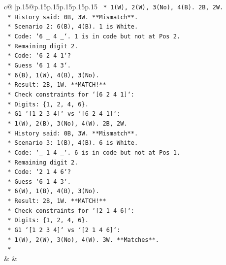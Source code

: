 \documentclass{article}
\begin{document}
{\begin{supertabular}{c@{$\;$}|p{.15\linewidth}@{}p{.15\linewidth}p{.15\linewidth}p{.15\linewidth}p{.15\linewidth}p{.15\linewidth}}
{{{\texttt{                    *   1(W), 2(W), 3(No), 4(B). 2B, 2W.} \\
\texttt{                    *   History said: 0B, 3W. **Mismatch**.} \\
\texttt{        *   Scenario 2: 6(B), 4(B). 1 is White.} \\
\texttt{            *   Code: `6 \_ 4 \_`. 1 is in code but not at Pos 2.} \\
\texttt{            *   Remaining digit 2.} \\
\texttt{            *   Code: `6 2 4 1`?} \\
\texttt{                *   Guess `6 1 4 3`.} \\
\texttt{                *   6(B), 1(W), 4(B), 3(No).} \\
\texttt{                *   Result: 2B, 1W. **MATCH!**} \\
\texttt{            *   Check constraints for `{[}6 2 4 1{]}`:} \\
\texttt{                *   Digits: \{1, 2, 4, 6\}.} \\
\texttt{                *   G1 `{[}1 2 3 4{]}` vs `{[}6 2 4 1{]}`:} \\
\texttt{                    *   1(W), 2(B), 3(No), 4(W). 2B, 2W.} \\
\texttt{                    *   History said: 0B, 3W. **Mismatch**.} \\
\texttt{        *   Scenario 3: 1(B), 4(B). 6 is White.} \\
\texttt{            *   Code: `\_ 1 4 \_`. 6 is in code but not at Pos 1.} \\
\texttt{            *   Remaining digit 2.} \\
\texttt{            *   Code: `2 1 4 6`?} \\
\texttt{                *   Guess `6 1 4 3`.} \\
\texttt{                *   6(W), 1(B), 4(B), 3(No).} \\
\texttt{                *   Result: 2B, 1W. **MATCH!**} \\
\texttt{            *   Check constraints for `{[}2 1 4 6{]}`:} \\
\texttt{                *   Digits: \{1, 2, 4, 6\}.} \\
\texttt{                *   G1 `{[}1 2 3 4{]}` vs `{[}2 1 4 6{]}`:} \\
\texttt{                    *   1(W), 2(W), 3(No), 4(W). 3W. **Matches**.} \\
\texttt{                *} \\
            }
        }
    }
    & & \\ \\


\end{supertabular}}
\end{document}
